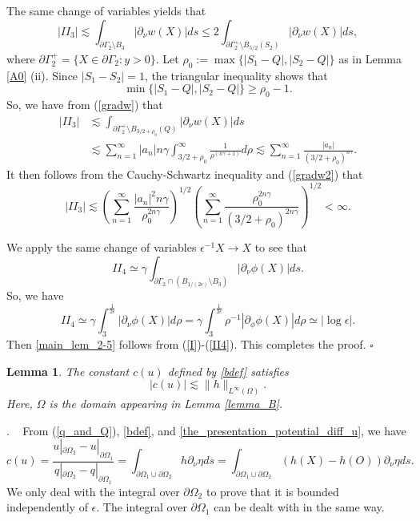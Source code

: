 \documentclass[11pt,a4paper]{article}
\numberwithin{equation}{section}
\newtheorem{lem}[thm]{Lemma}
\newcommand{\qed}{\hfill \ensuremath{\square}}
\newcommand{\pf}{\noindent {\sl Proof}. \ }
\newcommand{\p}{\partial}
\newcommand{\norm}[1]{\| #1 \|}
\newcommand{\eqnref}[1]{(\ref {#1})}
\newcommand{\Ge}{\epsilon}
\newcommand{\Gf}{\phi}
\newcommand{\Gg}{\gamma}
\newcommand{\Gn}{\eta}
\newcommand{\Gr}{\rho}
\newcommand{\GG}{\Gamma}
\newcommand{\GO}{\Omega}
\newcommand{\beq}{\begin{equation}}
\newcommand{\eeq}{\end{equation}}
\begin{document}
The same change of variables yields that
$$
|II_3| \lesssim \int_{\p \GG_2 \setminus B_{3}} \left | \p_{\nu} w (X) \right|  ds \le 2 \int_{\p \GG_2^+ \setminus B_{5/2}(S_2)} \left | \p_{\nu} w (X) \right|  ds,
$$
where $\p \GG_2^+ = \{ X \in \p \GG_2: y>0 \}$. Let $\Gr_0:= \max \{ |S_1-Q|, |S_2-Q| \}$ as in Lemma \ref{A0} (ii). Since $|S_1-S_2|=1$, the triangular inequality shows that
$$
\min \{ |S_1-Q|, |S_2-Q| \} \ge \Gr_0-1.
$$
So, we have from \eqnref{gradw} that
\begin{align*}
|II_3| &\lesssim \int_{\p \GG_2^+ \setminus B_{3/2+\Gr_0}(Q)} \left | \p_{\nu} w (X) \right|  ds \\
& \lesssim \sum_{n=1}^{\infty} |a_n| n\Gg \int_{3/2+\Gr_0}^\infty \frac{1}{\Gr^{(n\Gg + 1)}} d\Gr \lesssim \sum_{n=1}^{\infty} \frac{|a_n|}{(3/2+\Gr_0)^{n\Gg}} .
\end{align*}
It then follows from the Cauchy-Schwartz inequality and \eqnref{gradw2} that
\beq\label{II3}
|II_3| \lesssim \left( \sum_{n=1}^\infty \frac{|a_n|^2 n \Gg}{\Gr_0^{2n\Gg}} \right)^{1/2} \left( \sum_{n=1}^\infty \frac{\Gr_0^{2n\Gg}}{(3/2+\Gr_0)^{2n\Gg}} \right)^{1/2} < \infty.
\eeq

We apply the same change of variables $\Ge^{-1} X \to X$ to see that
$$
II_4 \simeq \Gg \int_{\p \GG_2 \cap (B_{1/(2\Ge)} \setminus B_{3})} |\p_{\nu} \Gf (X)| ds.
$$
So, we have
\beq\label{II4}
II_4 \simeq \Gg \int_{3}^{\frac{1}{2\Ge}} |\p_{\nu} \Gf (X)|d\Gr =  \Gg \int_{3}^{\frac{1}{2\Ge}} \Gr^{-1} |\p_\Gf \Gf(X)| d\Gr \simeq |\log \Ge| .
\eeq
Then \eqref{main_lem_2-5} follows from \eqnref{I}-\eqnref{II4}. This completes the proof.
\qed


\begin{lem}\label{lemma_for_b}
The constant $c(u)$ defined by \eqref{bdef} satisfies
\beq\label{cuest}
|c(u)| \lesssim \norm{h}_{L^{\infty}(\GO)} .
\eeq
Here, $\GO$ is the domain appearing in Lemma \ref{lemma_B}. 
\end{lem}
\pf
From \eqnref{q_and_Q}, \eqref{bdef}, and \eqref{the_presentation_potential_diff_u}, we have
\beq
c(u) =  \frac {u |_{\p \GO_2} - u|_{\p \GO_1}}{q |_{\p \GO_2} - q|_{\p \GO_1} } = \int_{\p \GO_1 \cup \p \GO_2} h \p_{\nu} \Gn ds = \int_{\p \GO_1 \cup \p \GO_2} (h(X) - h(O)) \p_{\nu} \Gn ds .
\eeq
We only deal with the integral over $\p\GO_2$ to prove that it is bounded independently of $\Ge$. The integral over $\p\GO_1$ can be dealt with in the same way.
\end{document}
